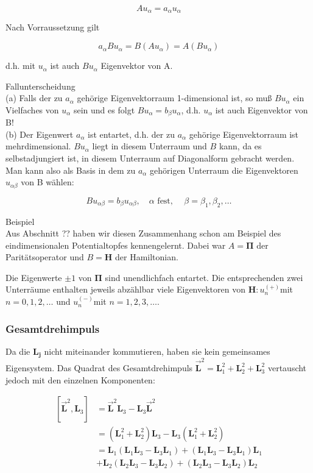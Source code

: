 \documentclass[10pt, letterpaper]{article}
\begin{document}
$$
A u_{\alpha}=a_{\alpha} u_{\alpha}
$$

Nach Vorraussetzung gilt

$$
a_{\alpha} B u_{\alpha}=B\left(A u_{\alpha}\right)=A\left(B u_{\alpha}\right)
$$

d.h. mit $u_{\alpha}$ ist auch $B u_{\alpha}$ Eigenvektor von A.

Fallunterscheidung\\
(a) Falls der zu $a_{\alpha}$ gehörige Eigenvektorraum 1-dimensional ist, so muß $B u_{\alpha}$ ein Vielfaches von $u_{\alpha}$ sein und es folgt $B u_{\alpha}=b_{\beta} u_{\alpha}$, d.h. $u_{\alpha}$ ist auch Eigenvektor von B!\\
(b) Der Eigenwert $a_{\alpha}$ ist entartet, d.h. der zu $a_{\alpha}$ gehörige Eigenvektorraum ist mehrdimensional. $B u_{\alpha}$ liegt in diesem Unterraum und $B$ kann, da es selbstadjungiert ist, in diesem Unterraum auf Diagonalform gebracht werden. Man kann also als Basis in dem zu $a_{\alpha}$ gehörigen Unterraum die Eigenvektoren $u_{\alpha \beta}$ von B wählen:

$$
B u_{\alpha \beta}=b_{\beta} u_{\alpha \beta}, \quad \alpha \text { fest, } \quad \beta=\beta_{1}, \beta_{2}, \ldots
$$

Beispiel\\
Aus Abschnitt ?? haben wir diesen Zusammenhang schon am Beispiel des eindimensionalen Potentialtopfes kennengelernt. Dabei war $A=\boldsymbol{\Pi}$ der Paritätsoperator und $B=\mathbf{H}$ der Hamiltonian.

Die Eigenwerte $\pm 1$ von $\boldsymbol{\Pi}$ sind unendlichfach entartet. Die entsprechenden zwei Unterräume enthalten jeweils abzählbar viele Eigenvektoren von $\mathbf{H}: u_{n}^{(+)}$mit $n=0,1,2, \ldots$ und $u_{n}^{(-)}$mit $n=1,2,3, \ldots$.

\subsubsection*{Gesamtdrehimpuls}
Da die $\mathbf{L}_{\mathbf{j}}$ nicht miteinander kommutieren, haben sie kein gemeinsames Eigensystem. Das Quadrat des Gesamtdrehimpuls $\overrightarrow{\mathbf{L}}^{2}=\mathbf{L}_{1}^{2}+\mathbf{L}_{2}^{2}+\mathbf{L}_{3}^{2}$ vertauscht jedoch mit den einzelnen Komponenten:

$$
\begin{aligned}
{\left[\overrightarrow{\mathbf{L}}^{2}, \mathbf{L}_{3}\right] } & =\overrightarrow{\mathbf{L}}^{2} \mathbf{L}_{3}-\mathbf{L}_{3} \overrightarrow{\mathbf{L}}^{2} \\
& =\left(\mathbf{L}_{1}^{2}+\mathbf{L}_{2}^{2}\right) \mathbf{L}_{3}-\mathbf{L}_{3}\left(\mathbf{L}_{1}^{2}+\mathbf{L}_{2}^{2}\right) \\
& =\mathbf{L}_{1}\left(\mathbf{L}_{1} \mathbf{L}_{3}-\mathbf{L}_{3} \mathbf{L}_{1}\right)+\left(\mathbf{L}_{1} \mathbf{L}_{3}-\mathbf{L}_{3} \mathbf{L}_{1}\right) \mathbf{L}_{1} \\
& +\mathbf{L}_{2}\left(\mathbf{L}_{2} \mathbf{L}_{3}-\mathbf{L}_{3} \mathbf{L}_{2}\right)+\left(\mathbf{L}_{2} \mathbf{L}_{3}-\mathbf{L}_{3} \mathbf{L}_{2}\right) \mathbf{L}_{2}
\end{aligned}
$$
\end{document}
